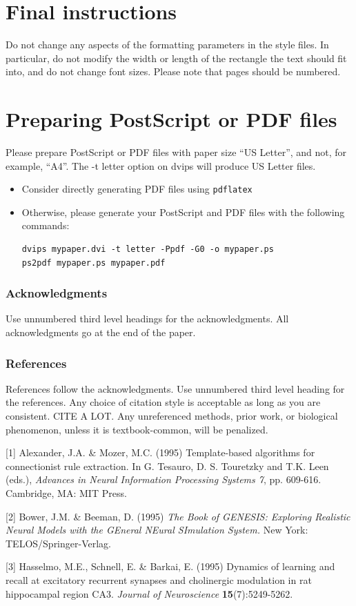 \documentclass{article} %
\begin{document}
\section{Final instructions}
Do not change any aspects of the formatting parameters in the style
files.  In particular, do not modify the width or length of the
rectangle the text should fit into, and do not change font sizes.
Please note that pages should be numbered.

\section{Preparing PostScript or PDF files}

Please prepare PostScript or PDF files with paper size ``US Letter'', and
not, for example, ``A4''. The -t
letter option on dvips will produce US Letter files.

\begin{itemize}

\item Consider directly generating PDF files using \verb+pdflatex+

\item Otherwise, please generate your PostScript and PDF files with the following commands:
\begin{verbatim}
dvips mypaper.dvi -t letter -Ppdf -G0 -o mypaper.ps
ps2pdf mypaper.ps mypaper.pdf
\end{verbatim}
\end{itemize}


\subsubsection*{Acknowledgments}

Use unnumbered third level headings for the acknowledgments. All
acknowledgments go at the end of the paper.

\subsubsection*{References}

References follow the acknowledgments. Use unnumbered third level heading for
the references. Any choice of citation style is acceptable as long as you are
consistent. CITE A LOT. Any unreferenced methods, prior work, or biological phenomenon, unless it is textbook-common, will be penalized.

\small{
[1] Alexander, J.A. \& Mozer, M.C. (1995) Template-based algorithms
for connectionist rule extraction. In G. Tesauro, D. S. Touretzky
and T.K. Leen (eds.), {\it Advances in Neural Information Processing
Systems 7}, pp. 609-616. Cambridge, MA: MIT Press.

[2] Bower, J.M. \& Beeman, D. (1995) {\it The Book of GENESIS: Exploring
Realistic Neural Models with the GEneral NEural SImulation System.}
New York: TELOS/Springer-Verlag.

[3] Hasselmo, M.E., Schnell, E. \& Barkai, E. (1995) Dynamics of learning
and recall at excitatory recurrent synapses and cholinergic modulation
in rat hippocampal region CA3. {\it Journal of Neuroscience}
{\bf 15}(7):5249-5262.
}
\end{document}
